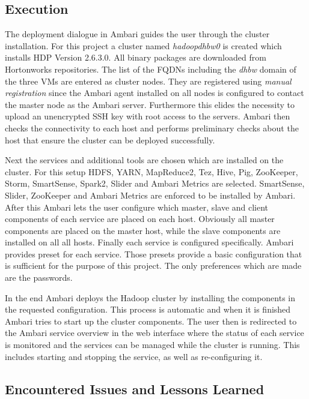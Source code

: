 \subsection{Execution}

The deployment dialogue in Ambari guides the user through the cluster installation.
For this project a cluster named \emph{hadoopdhbw0} is created which installs \ac{HDP} Version 2.6.3.0. All binary packages are downloaded from Hortonworks repositories.
The list of the \acp{FQDN} including the \emph{dhbw} domain of the three \acp{VM} are entered as cluster nodes. They are registered using \emph{manual registration} since the Ambari agent installed on all nodes is configured to contact the master node as the Ambari server. Furthermore this elides the necessity to upload an unencrypted \ac{SSH} key with root access to the servers.
Ambari then checks the connectivity to each host and performs preliminary checks about the host that ensure the cluster can be deployed successfully.

Next the services and additional tools are chosen which are installed on the cluster.
For this setup \ac{HDFS}, \ac{YARN}, MapReduce2, Tez, Hive, Pig, ZooKeeper, Storm, SmartSense, Spark2, Slider and Ambari Metrics are selected. SmartSense, Slider, ZooKeeper and Ambari Metrics are enforced to be installed by Ambari. 
After this Ambari lets the user configure which master, slave and client components of each service are placed on each host.
Obviously all master components are placed on the master host, while the slave components are installed on all all hosts.
Finally each service is configured specifically. 
Ambari provides preset for each service.
Those presets provide a basic configuration that is sufficient for the purpose of this project. 
The only preferences which are made are the passwords.

In the end Ambari deploys the Hadoop cluster by installing the components in the requested 
configuration. 
This process is automatic and when it is finished Ambari tries to start up the cluster components. The user then is redirected to the Ambari service overview in the web interface where the status of each service is monitored and the services can be managed while the cluster is running. This includes starting and stopping the service, as well as re-configuring it.

\subsection{Encountered Issues and Lessons Learned}

